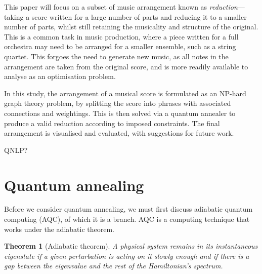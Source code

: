\documentclass[12pt]{article}
\newtheorem*{theorem}{Theorem}
\theoremstyle{definition}
\begin{document}
This paper will focus on a subset of music arrangement known as \textit{reduction}—taking a score written for a large number of parts and reducing it to a smaller number of parts, whilst still retaining the musicality and structure of the original. This is a common task in music production, where a piece written for a full orchestra may need to be arranged for a smaller ensemble, such as a string quartet. This forgoes the need to generate new music, as all notes in the arrangement are taken from the original score, and is more readily available to analyse as an optimisation problem.

In this study, the arrangement of a musical score is formulated as an NP-hard graph theory problem, by splitting the score into phrases with associated connections and weightings. This is then solved via a quantum annealer to produce a valid reduction according to imposed constraints. The final arrangement is visualised and evaluated, with suggestions for future work.

QNLP?

\section{Quantum annealing}

Before we consider quantum annealing, we must first discuss adiabatic quantum computing (AQC), of which it is a branch. AQC is a computing technique that works under the adiabatic theorem.

\begin{theorem}[Adiabatic theorem]
    A physical system remains in its instantaneous eigenstate if a given perturbation is acting on it slowly enough and if there is a gap between the eigenvalue and the rest of the Hamiltonian's spectrum. \cite{born_beweis_1928}
\end{theorem}
\end{document}
